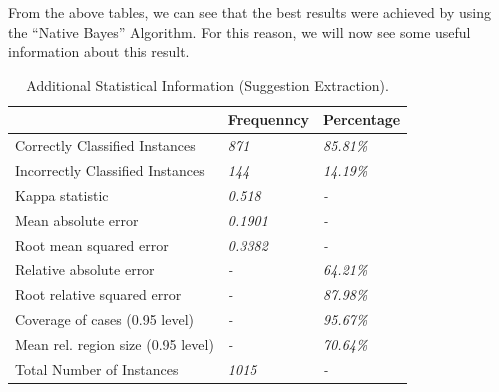 From the above tables, we can see that the best results were achieved by using the ``Native Bayes'' Algorithm. For this reason, we will now see some useful information about this result.

\begin{table}[H]
\centering
\caption{Additional Statistical Information (Suggestion Extraction).}
\label{48_table_rer}
\begin{tabular}{lll}
\hline
                                   & {\bf Frequenncy} & {\bf Percentage} \\ \hline
Correctly Classified Instances     & {\it 871}        & {\it 85.81\%}    \\
Incorrectly Classified Instances   & {\it 144}        & {\it 14.19\%}    \\
Kappa statistic                    & {\it 0.518}      & {\it -}          \\
Mean absolute error                & {\it 0.1901}     & {\it -}          \\
Root mean squared error            & {\it 0.3382}     & {\it -}          \\
Relative absolute error            & {\it -}          & {\it 64.21\%}    \\
Root relative squared error        & {\it -}          & {\it 87.98\%}    \\
Coverage of cases (0.95 level)     & {\it -}          & {\it 95.67\%}    \\
Mean rel. region size (0.95 level) & {\it -}          & {\it 70.64\%}    \\
Total Number of Instances          & {\it 1015}       & {\it -}          \\ \hline
\end{tabular}
\end{table}

